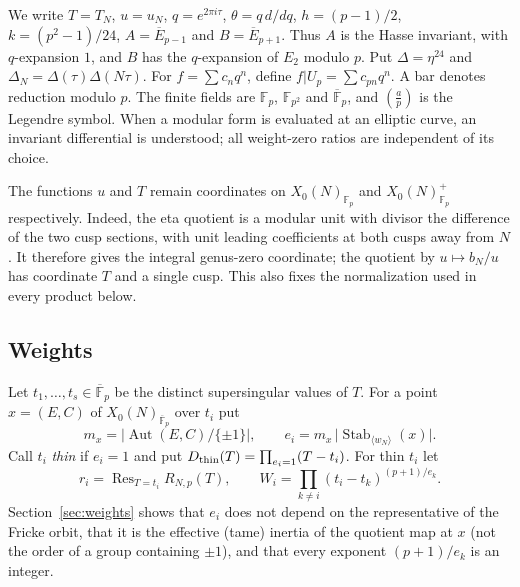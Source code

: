 \documentclass[11pt,a4paper]{article}
\numberwithin{equation}{section}
\theoremstyle{definition}
\theoremstyle{remark}
\newcommand{\Fp}{\mathbb F_p}
\newcommand{\Fq}{\mathbb F_{p^2}}
\newcommand{\Fb}{\overline{\mathbb F}_p}
\newcommand{\Res}{\operatorname{Res}}
\newcommand{\Aut}{\operatorname{Aut}}
\newcommand{\Stab}{\operatorname{Stab}}
\begin{document}
We write $T=T_N$, $u=u_N$, $q=e^{2\pi i\tau}$, $\theta=q\,d/dq$,
$h=(p-1)/2$, $k=(p^2-1)/24$, $A=\overline E_{p-1}$ and
$B=\overline E_{p+1}$.
Thus $A$ is the Hasse invariant, with $q$-expansion $1$, and $B$ has the
$q$-expansion of $E_2$ modulo $p$. Put
$\Delta=\eta^{24}$ and $\Delta_N=\Delta(\tau)\Delta(N\tau)$.
For $f=\sum c_nq^n$, define $f|U_p=\sum c_{pn}q^n$.
A bar denotes reduction modulo $p$. The finite fields are
$\Fp$, $\Fq$ and $\Fb$, and $\left(\frac{a}{p}\right)$ is the Legendre symbol.
When a modular form is evaluated at an elliptic curve, an invariant differential
is understood; all weight-zero ratios are independent of its choice.

The functions $u$ and $T$ remain coordinates on $X_0(N)_{\Fp}$ and
$X_0(N)^+_{\Fp}$ respectively. Indeed, the eta quotient is a modular unit with
divisor the difference of the two cusp sections, with unit leading coefficients
at both cusps away from $N$. It therefore gives the integral genus-zero coordinate;
the quotient by $u\mapsto b_N/u$ has coordinate $T$ and a single cusp.
This also fixes the normalization used in every product below.
\subsection{Weights}
Let $t_1,\dots,t_s\in\Fb$ be the distinct supersingular values of $T$. For a point
$x=(E,C)$ of $X_0(N)_{\Fb}$ over $t_i$ put
\[
m_x=\bigl|\Aut(E,C)/\{\pm1\}\bigr|,\qquad e_i=m_x\,\bigl|\Stab_{\langle w_N\rangle}(x)\bigr|.
\]
Call $t_i$ \emph{thin} if $e_i=1$ and put $D_{\rm thin}(T)=\prod_{e_i=1}(T-t_i)$. For thin $t_i$ let
\[
r_i=\Res_{T=t_i}R_{N,p}(T),\qquad W_i=\prod_{k\ne i}(t_i-t_k)^{(p+1)/e_k}.
\]
Section~\ref{sec:weights} shows that $e_i$ does not depend on the representative of the Fricke
orbit, that it is the effective (tame) inertia of the quotient map at $x$ (not the order of a group
containing $\pm1$), and that every exponent $(p+1)/e_k$ is an integer.
\end{document}

